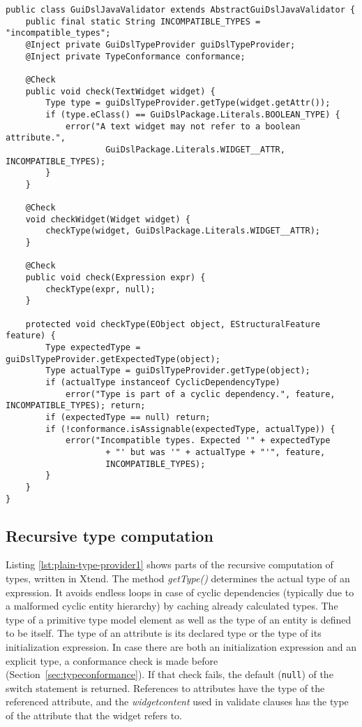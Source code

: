 \begin{lstlisting}[float=tb,label=lst:validation-plain,caption=Xtext validator.] 
public class GuiDslJavaValidator extends AbstractGuiDslJavaValidator {
	public final static String INCOMPATIBLE_TYPES = "incompatible_types";
	@Inject private GuiDslTypeProvider guiDslTypeProvider;
	@Inject private TypeConformance conformance;

	@Check
	public void check(TextWidget widget) {
		Type type = guiDslTypeProvider.getType(widget.getAttr());
		if (type.eClass() == GuiDslPackage.Literals.BOOLEAN_TYPE) {
			error("A text widget may not refer to a boolean attribute.",
					GuiDslPackage.Literals.WIDGET__ATTR, INCOMPATIBLE_TYPES);
		}
	}

	@Check
	void checkWidget(Widget widget) {
		checkType(widget, GuiDslPackage.Literals.WIDGET__ATTR);
	}
	
	@Check
	public void check(Expression expr) {
		checkType(expr, null);
	}
	
	protected void checkType(EObject object, EStructuralFeature feature) {
		Type expectedType = guiDslTypeProvider.getExpectedType(object);
		Type actualType = guiDslTypeProvider.getType(object);
		if (actualType instanceof CyclicDependencyType)
			error("Type is part of a cyclic dependency.", feature, INCOMPATIBLE_TYPES); return;
		if (expectedType == null) return;
		if (!conformance.isAssignable(expectedType, actualType)) {
			error("Incompatible types. Expected '" + expectedType
					+ "' but was '" + actualType + "'", feature,
					INCOMPATIBLE_TYPES);
		}
	}
}
\end{lstlisting}

\subsection{Recursive type computation}
\label{sec:rectypecomputation}

Listing \ref{lst:plain-type-provider1} shows parts of the recursive computation
of types, written in Xtend. The method \emph{getType()} determines the actual
type of an expression. It avoids endless loops in case of cyclic dependencies
(typically due to a malformed cyclic entity hierarchy) by caching already
calculated types.  The type of a primitive type model element as well as the
type of an entity is defined to be itself. The type of an attribute is its
declared type or the type of its initialization expression.
In case there are both an initialization expression and an explicit type, a
conformance check is made before (Section~\ref{sec:typeconformance}). If that
check fails, the default (\verb|null|) of the switch statement is returned.
References to attributes have the type of the referenced attribute, and the
\emph{widgetcontent} used in validate clauses has the type of the attribute that
the widget refers to.

